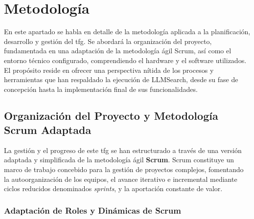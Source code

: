 
\chapter{Metodología}
\label{metodologia}

En este apartado se habla en detalle de la metodología aplicada a la planificación, desarrollo y gestión del \gls{tfg}. Se abordará la organización del proyecto, fundamentada en una adaptación de la metodología ágil Scrum, así como el entorno técnico configurado, comprendiendo el hardware y el software utilizados. El propósito reside en ofrecer una perspectiva nítida de los procesos y herramientas que han respaldado la ejecución de LLMSearch, desde su fase de concepción hasta la implementación final de sus funcionalidades.

\section{Organización del Proyecto y Metodología Scrum Adaptada}
\label{sec:organizacion_proyecto}

La gestión y el progreso de este \gls{tfg} se han estructurado a través de una versión adaptada y simplificada de la metodología ágil \textbf{Scrum}. Scrum constituye un marco de trabajo concebido para la gestión de proyectos complejos, fomentando la autoorganización de los equipos, el avance iterativo e incremental mediante ciclos reducidos denominados \textit{sprints}, y la aportación constante de valor.

\subsection{Adaptación de Roles y Dinámicas de Scrum}
\label{subsec:roles_scrum}

